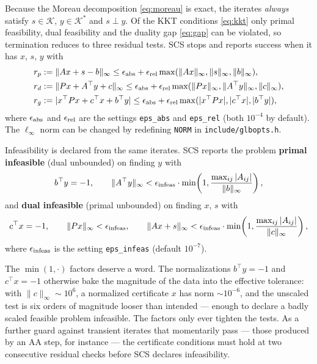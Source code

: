 \documentclass[11pt,a4paper]{article}
\newcommand{\K}{\mathcal{K}}
\newcommand{\tr}{^\top}
\theoremstyle{plain}
\begin{document}
Because the Moreau decomposition \eqref{eq:moreau} is exact, the iterates
\emph{always} satisfy $s \in \K$, $y \in \K^*$ and $s \perp y$. Of the KKT
conditions \eqref{eq:kkt} only primal feasibility, dual feasibility and the
duality gap \eqref{eq:gap} can be violated, so termination reduces to three
residual tests. SCS stops and reports success when it has $x$, $s$, $y$ with
\begin{align}
r_p &:= \|Ax + s - b\|_\infty
      \leq \epsilon_{\rm abs} + \epsilon_{\rm rel}
            \max(\|Ax\|_\infty, \|s\|_\infty, \|b\|_\infty),
      \label{eq:tp}\\
r_d &:= \|Px + A\tr y + c\|_\infty
      \leq \epsilon_{\rm abs} + \epsilon_{\rm rel}
            \max(\|Px\|_\infty, \|A\tr y\|_\infty, \|c\|_\infty),
      \label{eq:td}\\
r_g &:= |x\tr Px + c\tr x + b\tr y|
      \leq \epsilon_{\rm abs} + \epsilon_{\rm rel}
            \max(|x\tr Px|, |c\tr x|, |b\tr y|),
      \label{eq:tg}
\end{align}
where $\epsilon_{\rm abs}$ and $\epsilon_{\rm rel}$ are the settings
\texttt{eps\_abs} and \texttt{eps\_rel} (both $10^{-4}$ by default). The
$\ell_\infty$ norm can be changed by redefining \texttt{NORM} in
\texttt{include/glbopts.h}.

Infeasibility is declared from the same iterates. SCS reports the problem
\textbf{primal infeasible} (dual unbounded) on finding $y$ with
\begin{equation}\label{eq:tpinf}
b\tr y = -1, \qquad
\|A\tr y\|_\infty < \epsilon_{\rm infeas}
  \cdot \min\!\left(1, \frac{\max_{ij}|A_{ij}|}{\|b\|_\infty}\right),
\end{equation}
and \textbf{dual infeasible} (primal unbounded) on finding $x$, $s$ with
\begin{equation}\label{eq:tdinf}
c\tr x = -1, \qquad
\|Px\|_\infty < \epsilon_{\rm infeas}, \qquad
\|Ax + s\|_\infty < \epsilon_{\rm infeas}
  \cdot \min\!\left(1, \frac{\max_{ij}|A_{ij}|}{\|c\|_\infty}\right),
\end{equation}
where $\epsilon_{\rm infeas}$ is the setting \texttt{eps\_infeas} (default
$10^{-7}$).

The $\min(1,\cdot)$ factors deserve a word. The normalizations $b\tr y = -1$
and $c\tr x = -1$ otherwise bake the magnitude of the data into the effective
tolerance: with $\|c\|_\infty \sim 10^6$, a normalized certificate $x$ has norm
$\sim 10^{-6}$, and the unscaled test is six orders of magnitude looser than
intended --- enough to declare a badly scaled feasible problem infeasible. The
factors only ever tighten the tests. As a further guard against transient
iterates that momentarily pass --- those produced by an AA step, for instance
--- the certificate conditions must hold at two consecutive residual checks
before SCS declares infeasibility.
\end{document}
